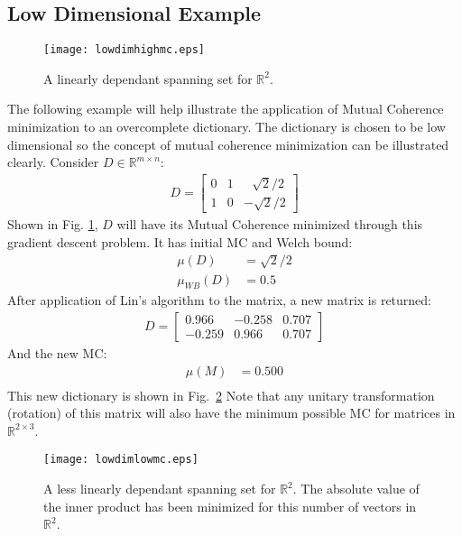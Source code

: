 \documentclass[journal]{IEEEtran}
\begin{document}
\subsection{Low Dimensional Example}
\begin{figure}[!h]
\centering
\texttt{[image: lowdimhighmc.eps]}
\caption{A linearly dependant spanning set for $\mathbb{R}^2$.}
\label{Fig:lowdimhigh}
\end{figure}
\noindent The following example will help illustrate the application of Mutual Coherence minimization
to an overcomplete dictionary. The dictionary is chosen to be low dimensional so the concept
of mutual coherence minimization can be illustrated clearly.
Consider $D \in \mathbb{R}^{m\times n}$:
\begin{align}
    D = \begin{bmatrix} 0 &1 &\>\>\>\sqrt{2}/2 \\
                        1 &0 &-\sqrt{2}/2 \end{bmatrix}
\end{align}
Shown in Fig. \ref{Fig:lowdimhigh}, $D$ will have its Mutual Coherence minimized through this gradient 
descent problem.
It has initial MC and Welch bound:
\begin{align}
\mu (D) &= \sqrt{2}/2 \\
\mu_{WB} (D) &= 0.5
\end{align}
After application of Lin's algorithm to the matrix, a new matrix is returned:
\begin{align}
    D = \left[\begin{array}{ccc} 0.966 & -0.258  &0.707\\ -0.259 & 0.966 & 0.707 \end{array}\right] 
\end{align}
And the new MC:
\begin{align}
\mu (M) &= 0.500 \\[1em]
\end{align}
This new dictionary is shown in Fig.~\ref{Fig:lowdimlow}
Note that any unitary transformation (rotation) of this matrix will also have the minimum possible MC for
matrices in $\mathbb{R}^{2 \times 3}$.
\begin{figure}[!t]
\centering
\texttt{[image: lowdimlowmc.eps]}
\caption{A less linearly dependant spanning set for $\mathbb{R}^2$. The absolute value
of the inner product has been minimized for this number of vectors in $\mathbb{R}^2$.}
\label{Fig:lowdimlow}
\end{figure}
\end{document}
